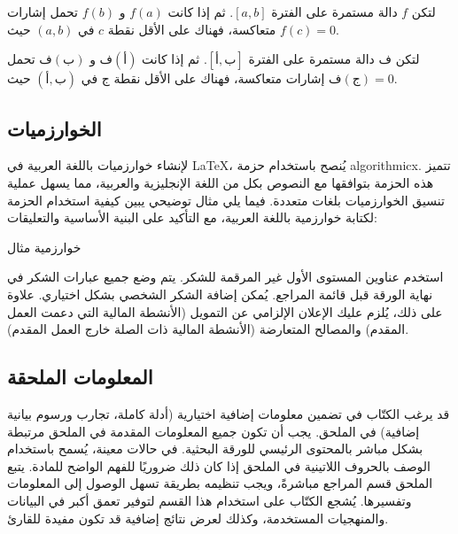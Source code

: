 \documentclass[12pt]{article}
\begin{document}
\begin{theorem}
لتكن \( f \) دالة مستمرة على الفترة \([a, b]\). ثم إذا كانت \( f(a) \) و \( f(b) \) تحمل إشارات متعاكسة، فهناك على الأقل نقطة \( c \) في \((a, b)\) حيث \( f(c) = 0 \).
\end{theorem} 

\begin{theorem}
لتكن \( \text{ف} \) دالة مستمرة على الفترة \([\text{أ}, \text{ب}]\). ثم إذا كانت \( \text{ف}(\text{أ}) \) و \( \text{ف}(\text{ب}) \) تحمل إشارات متعاكسة، فهناك على الأقل نقطة \( \text{ج} \) في \((\text{أ}, \text{ب})\) حيث \( \text{ف}(\text{ج}) = 0 \).
\end{theorem}

\subsection{\textarabic{الخوارزميات}}
لإنشاء خوارزميات باللغة العربية في LaTeX، يُنصح باستخدام حزمة algorithmicx. تتميز هذه الحزمة بتوافقها مع النصوص بكل من اللغة الإنجليزية والعربية، مما يسهل عملية تنسيق الخوارزميات بلغات متعددة. فيما يلي مثال توضيحي يبين كيفية استخدام الحزمة لكتابة خوارزمية باللغة العربية، مع التأكيد على البنية الأساسية والتعليقات:

\begin{algorithm}
\caption{خوارزمية مثال}
\begin{algorithmic}[1]
   
\EndProcedure
\end{algorithmic}
\end{algorithm}

\begin{ack}
استخدم عناوين المستوى الأول غير المرقمة للشكر. يتم وضع جميع عبارات الشكر في نهاية الورقة قبل قائمة المراجع. يُمكن إضافة الشكر الشخصي بشكل اختياري. علاوة على ذلك، يُلزم عليك الإعلان الإلزامي عن التمويل (الأنشطة المالية التي دعمت العمل المقدم) والمصالح المتعارضة (الأنشطة المالية ذات الصلة خارج العمل المقدم).
\end{ack}


\subsection{المعلومات الملحقة}

قد يرغب الكتّاب في تضمين معلومات إضافية اختيارية (أدلة كاملة، تجارب ورسوم بيانية إضافية) في الملحق. يجب أن تكون جميع المعلومات المقدمة في الملحق مرتبطة بشكل مباشر بالمحتوى الرئيسي للورقة البحثية. في حالات معينة، يُسمح باستخدام الوصف بالحروف اللاتينية في الملحق إذا كان ذلك ضروريًا للفهم الواضح للمادة. يتبع الملحق قسم المراجع مباشرةً، ويجب تنظيمه بطريقة تسهل الوصول إلى المعلومات وتفسيرها. يُشجع الكتّاب على استخدام هذا القسم لتوفير تعمق أكبر في البيانات والمنهجيات المستخدمة، وكذلك لعرض نتائج إضافية قد تكون مفيدة للقارئ.



\end{document}
